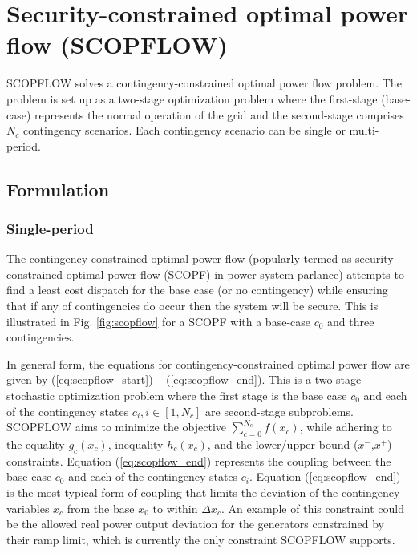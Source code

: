 \chapter{Security-constrained optimal power flow (SCOPFLOW)}
\label{chap:scopflow}

SCOPFLOW solves a contingency-constrained optimal power flow problem. The problem is set up as a two-stage optimization problem where the first-stage (base-case) represents the normal operation of the grid and the second-stage comprises $N_c$ contingency scenarios. Each contingency scenario can be single or multi-period.

\section{Formulation}

\subsection{Single-period}

The contingency-constrained optimal power flow (popularly termed as security-constrained optimal power flow (SCOPF) in power system parlance) attempts to find a least cost dispatch for the base case (or no contingency) while ensuring that if any of contingencies do occur then the system will be secure. This is illustrated in Fig. \ref{fig:scopflow} for a SCOPF with a base-case $c_0$ and three contingencies.



In general form, the equations for contingency-constrained optimal power flow are given by
(\ref{eq:scopflow_start}) -- (\ref{eq:scopflow_end}). This is a two-stage
stochastic optimization problem where the first stage is the base case $c_0$ and
each of the contingency states $c_i, i \in [1,N_c]$ are second-stage
subproblems. SCOPFLOW aims to minimize the objective $\sum_{c=0}^{N_c}f(x_c)$,
while adhering to the equality $g_c(x_c)$, inequality $h_c(x_c)$, and the
lower/upper bound ($x^-$,$x^+$) constraints. Equation (\ref{eq:scopflow_end})
represents the coupling between the base-case $c_0$ and each of the contingency states
$c_i$. Equation (\ref{eq:scopflow_end}) is the most typical form of coupling
that limits the deviation of the contingency variables $x_c$ from the base $x_0$
to within $\Delta x_c$. An example of this constraint could be the allowed real power output deviation for the generators constrained by their ramp limit, which is currently the only constraint SCOPFLOW supports.


